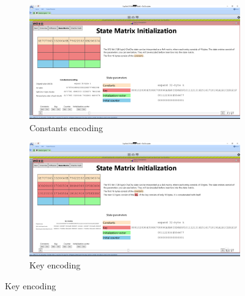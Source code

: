 \begin{figure}
\begin{subfigure}{\textwidth}
  \centering
  \includegraphics[width=\textwidth]{figures/ct2/state-matrix/1-state-matrix-constants.png}
  \caption{Constants encoding}
  \label{fig:statematrix.encoding.constants}
\end{subfigure}
\begin{subfigure}{\textwidth}
  \centering
  \includegraphics[width=\textwidth]{figures/ct2/state-matrix/2-state-matrix-key.png}
  \caption{Key encoding}
  \label{fig:statematrix.encoding.key}
\end{subfigure}
\end{figure}
